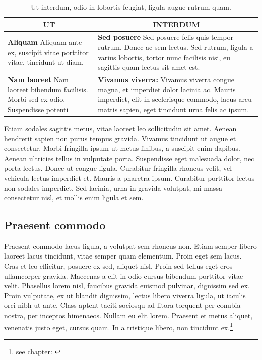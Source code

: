\begin{table}[htbp]
\begin{center}
\begin{tabular}{p{7.5cm} | p{7.5cm}}
\multicolumn{1}{c}{\textbf{UT}} & \multicolumn{1}{c}{\textbf{INTERDUM}} \\
\hline
\textbf{Aliquam} Aliquam ante ex, suscipit vitae porttitor vitae, tincidunt ut diam. & \textbf{Sed posuere} Sed posuere felis quis tempor rutrum. Donec ac sem lectus. Sed rutrum, ligula a varius lobortis, tortor nunc facilisis nisi, eu sagittis quam lectus sit amet est. \\
\textbf{Nam laoreet} Nam laoreet bibendum facilisis. Morbi sed ex odio. Suspendisse potenti &  \textbf{Vivamus viverra:} Vivamus viverra congue magna, et imperdiet dolor lacinia ac. Mauris imperdiet, elit in scelerisque commodo, lacus arcu mattis sapien, eget tincidunt urna felis ac ipsum.\\
\end{tabular}
\end{center}
\caption{Ut interdum, odio in lobortis feugiat, ligula augue rutrum quam.}
\label{tab:UtInterdum}
\end{table}


Etiam sodales sagittis metus, vitae laoreet leo sollicitudin sit amet. Aenean hendrerit sapien non purus tempus gravida. Vivamus tincidunt ut augue et consectetur. Morbi fringilla ipsum ut metus finibus, a suscipit enim dapibus. Aenean ultricies tellus in vulputate porta. Suspendisse eget malesuada dolor, nec porta lectus. Donec ut congue ligula. Curabitur fringilla rhoncus velit, vel vehicula lectus imperdiet et. Mauris a pharetra ipsum. Curabitur porttitor lectus non sodales imperdiet. Sed lacinia, urna in gravida volutpat, mi massa consectetur nisl, et mollis enim ligula et sem.\cite[S. 13ff]{Morbiac.20.02.1500}

\subsection{Praesent commodo}\label{subsec:PraesentCommodo}
Praesent commodo lacus ligula, a volutpat sem rhoncus non. Etiam semper libero laoreet lacus tincidunt, vitae semper quam elementum. Proin eget sem lacus. Cras et leo efficitur, posuere ex sed, aliquet nisl. Proin sed tellus eget eros ullamcorper gravida. Maecenas a elit in odio cursus bibendum porttitor vitae velit. Phasellus lorem nisl, faucibus gravida euismod pulvinar, dignissim sed ex. Proin vulputate, ex ut blandit dignissim, lectus libero viverra ligula, ut iaculis orci nibh ut ante. Class aptent taciti sociosqu ad litora torquent per conubia nostra, per inceptos himenaeos. Nullam eu elit lorem. Praesent et metus aliquet, venenatis justo eget, cursus quam. In a tristique libero, non tincidunt ex.\footnote{see chapter:  \label{foot:Fuß1}}

